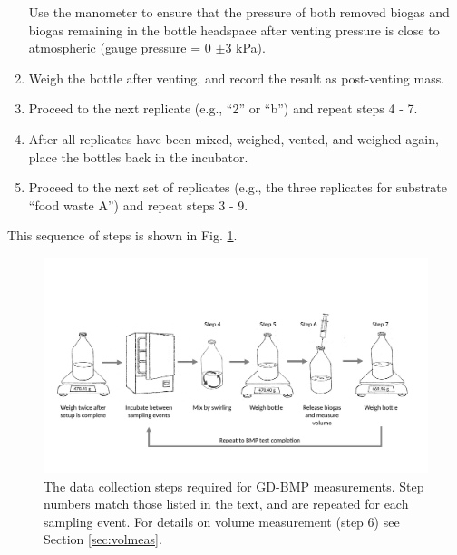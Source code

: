 \documentclass[]{article}
\begin{document}
\begin{enumerate}
      Use the manometer to ensure that the pressure of both removed biogas and biogas remaining in the bottle headspace after venting pressure is close to atmospheric (gauge pressure = 0 $\pm3$ kPa).
    \item Weigh the bottle after venting, and record the result as post-venting mass. 
    \item Proceed to the next replicate (e.g., ``2'' or ``b'') and repeat steps 4 - 7.
    \item After all replicates have been mixed, weighed, vented, and weighed again, place the bottles back in the incubator.
    \item Proceed to the next set of replicates (e.g., the three replicates for substrate ``food waste A'') and repeat steps 3 - 9.
\end{enumerate}

This sequence of steps is shown in Fig. \ref{fig:steps}.

\begin{figure}
  \includegraphics[width=\textwidth]{figs/GD_steps.pdf}
  \caption{The data collection steps required for GD-BMP measurements. Step numbers match those listed in the text, and are repeated for each sampling event. For details on volume measurement (step 6) see Section \ref{sec:volmeas}.}
  \label{fig:steps}
\end{figure}
\end{document}
